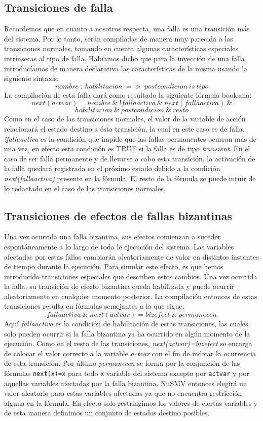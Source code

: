 \documentclass[titlepage, 12pt]{book}
\begin{document}
\subsection*{Transiciones de falla}
Recordemos que en cuanto a nosotros respecta, una falla es una transici\'on m\'as del sistema. Por lo tanto, ser\'an compiladas de manera muy parecida a las transiciones normales, tomando en cuenta algunas caracter\'isticas especiales intr\'insecas al tipo de falla. Hab\'iamos dicho que para la inyecci\'on de una falla introduc\'iamos de manera declarativa las caracter\'isticas de la misma usando la siguiente sintaxis:
$$nombre~:~habilitacion~=>~postcondicion~is~tipo$$
La compilaci\'on de esta falla dar\'a como resultado la siguiente f\'ormula booleana:
$$next(actvar)=nombre~\&~!fallaactiva~\&~next(fallaactiva)~\&$$ $$habilitacion~\&~postcondicion~\&~resto$$
Como en el caso de las transiciones normales, el valor de la variable de acci\'on relacionar\'a el estado destino a \'esta transici\'on, la cual en este caso es de falla. \textit{!fallaactiva} es la condici\'on que impide que las fallas permanentes ocurran mas de una vez, en efecto esta condici\'on es TRUE si la falla es de tipo \textit{transient}. En el caso de ser falla permanente y de llevarse a cabo esta transici\'on, la activaci\'on de la falla quedar\'a registrada en el pr\'oximo estado debido a la condici\'on \textit{next(fallaactiva)} presente en la f\'ormula. El resto de la f\'ormula se puede intuir de lo redactado en el caso de las transiciones normales.


\subsection*{Transiciones de efectos de fallas bizantinas}
Una vez ocurrida una falla bizantina, sus efectos comienzan a suceder espont\'aneamente a lo largo de toda le ejecuci\'on del sistema. Las variables afectadas por estas fallas cambiar\'an aleatoriamente de valor en distintos instantes de tiempo durante la ejecuci\'on. Para simular este efecto, es que hemos introducido transiciones especiales que describen estos cambios. Una vez ocurrida la falla, su transici\'on de efecto bizantina queda habilitada y puede ocurrir aleatoriamente en cualquier momento posterior. La compilaci\'on entonces de estas transiciones resulta en f\'ormulas semejantes a la que sigue:
$$fallaactiva~\&~next(actvar)=bizefect~\&~permanecen$$
Aqu\'i \textit{fallaactiva} es la condici\'on de habilitaci\'on de estas transiciones, las cuales solo pueden ocurrir si la falla bizantina ya ha ocurrido en alg\'un momento de la ejecuci\'on. Como en el resto de las transiciones, \textit{next(actvar)=bizefect} se encarga de colocar el valor correcto a la variable \textit{actvar} con el fin de indicar la ocurrencia de esta transici\'on. Por \'ultimo \textit{permanecen} se forma por la conjunci\'on de las f\'ormulas \texttt{next(x)=x} para todo \texttt{x} variable del sistema excepto por \texttt{actvar} y por aquellas variables afectadas por la falla bizantina. NuSMV entonces elegir\'a un valor aleatorio para estas variables afectadas ya que no encuentra restricci\'on alguna en la f\'ormula. En efecto solo restringimos los valores de ciertas variables y de esta manera definimos un conjunto de estados destino posibles.
\end{document}
